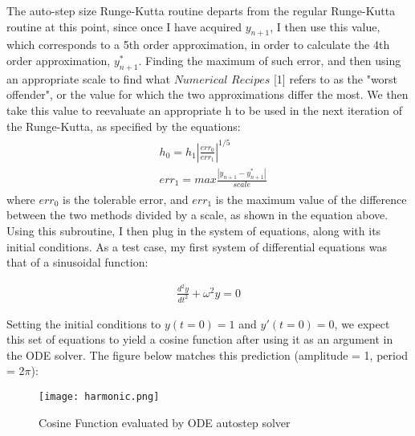 \documentclass[11pt,letterpaper]{article}
\begin{document}
The auto-step size Runge-Kutta routine departs from the regular Runge-Kutta routine at this point, since once I have acquired $y_{n+1}$, I then use this value, which corresponds to a 5th order approximation, in order to calculate the 4th order approximation, $y^*_{n+1}$. Finding the maximum of such error, and then using an appropriate scale to find what $\textit{Numerical Recipes}$ [1] refers to as the "worst offender", or the value for which the two approximations differ the most. We then take this value to reevaluate an appropriate h to be used in the next iteration of the Runge-Kutta, as specified by the equations:
\begin{eqnarray}
\begin{aligned}
&h_0 = h_1|\frac{err_0}{err_1}|^{1/5}\\
&err_1 = max\frac{|y_{n+1} - y^*_{n+1}|}{scale}
\end{aligned}
\end{eqnarray}
where $err_0$ is the tolerable error, and $err_1$ is the maximum value of the difference between the two methods divided by a scale, as shown in the equation above.
Using this subroutine, I then plug in the system of equations, along with its initial conditions. As a test case, my first system of differential equations was that of a sinusoidal function:

\begin{eqnarray}
\frac{d^2y}{dt^2} + \omega^2y = 0
\end{eqnarray}

Setting the initial conditions to $y(t=0)=1$ and $y′(t = 0)=0$, we expect this set of equations to yield a cosine function after using it as an argument in the ODE solver. The figure below matches this prediction (amplitude = 1, period = 2$\pi$):

\begin{figure}[htb!]
\begin{center}
\leavevmode
\texttt{[image: harmonic.png]}
\end{center}
\caption{Cosine Function evaluated by ODE autostep solver}
\label{fbigh}
\end{figure}

\newpage
\end{document}
